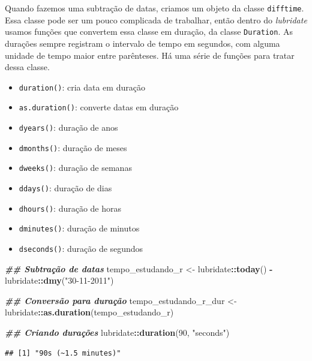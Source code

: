 \documentclass[
]{article}
\newenvironment{Shaded}{\begin{snugshade}}{\end{snugshade}}
\newcommand{\DecValTok}[1]{\textcolor[rgb]{0.00,0.00,0.81}{#1}}
\newcommand{\DocumentationTok}[1]{\textcolor[rgb]{0.56,0.35,0.01}{\textbf{\textit{#1}}}}
\newcommand{\FunctionTok}[1]{\textcolor[rgb]{0.13,0.29,0.53}{\textbf{#1}}}
\newcommand{\NormalTok}[1]{#1}
\newcommand{\OtherTok}[1]{\textcolor[rgb]{0.56,0.35,0.01}{#1}}
\newcommand{\SpecialCharTok}[1]{\textcolor[rgb]{0.81,0.36,0.00}{\textbf{#1}}}
\newcommand{\StringTok}[1]{\textcolor[rgb]{0.31,0.60,0.02}{#1}}
\providecommand{\tightlist}{%
  \setlength{\itemsep}{0pt}\setlength{\parskip}{0pt}}
\begin{document}
Quando fazemos uma subtração de datas, criamos um objeto da classe \texttt{difftime}. Essa classe pode ser um pouco complicada de trabalhar, então dentro do \emph{lubridate} usamos funções que convertem essa classe em duração, da classe \texttt{Duration}. As durações sempre registram o intervalo de tempo em segundos, com alguma unidade de tempo maior entre parênteses. Há uma série de funções para tratar dessa classe.

\begin{itemize}
\tightlist
\item
  \texttt{duration()}: cria data em duração
\item
  \texttt{as.duration()}: converte datas em duração
\item
  \texttt{dyears()}: duração de anos
\item
  \texttt{dmonths()}: duração de meses
\item
  \texttt{dweeks()}: duração de semanas
\item
  \texttt{ddays()}: duração de dias
\item
  \texttt{dhours()}: duração de horas
\item
  \texttt{dminutes()}: duração de minutos
\item
  \texttt{dseconds()}: duração de segundos
\end{itemize}

\begin{Shaded}
\begin{Highlighting}[]
\DocumentationTok{\#\# Subtração de datas}
\NormalTok{tempo\_estudando\_r }\OtherTok{\textless{}{-}}\NormalTok{ lubridate}\SpecialCharTok{::}\FunctionTok{today}\NormalTok{() }\SpecialCharTok{{-}}\NormalTok{ lubridate}\SpecialCharTok{::}\FunctionTok{dmy}\NormalTok{(}\StringTok{"30{-}11{-}2011"}\NormalTok{)}

\DocumentationTok{\#\# Conversão para duração}
\NormalTok{tempo\_estudando\_r\_dur }\OtherTok{\textless{}{-}}\NormalTok{ lubridate}\SpecialCharTok{::}\FunctionTok{as.duration}\NormalTok{(tempo\_estudando\_r)}

\DocumentationTok{\#\# Criando durações}
\NormalTok{lubridate}\SpecialCharTok{::}\FunctionTok{duration}\NormalTok{(}\DecValTok{90}\NormalTok{, }\StringTok{"seconds"}\NormalTok{)}
\end{Highlighting}
\end{Shaded}

\begin{verbatim}
## [1] "90s (~1.5 minutes)"
\end{verbatim}
\end{document}

